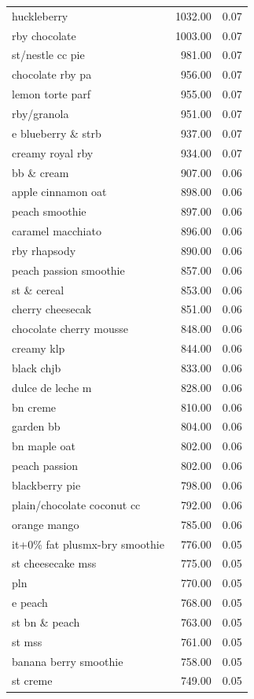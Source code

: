 \begin{table}
\begin{tabular}{lrr}
huckleberry & 1032.00 & 0.07 \\
rby chocolate & 1003.00 & 0.07 \\
st/nestle cc pie & 981.00 & 0.07 \\
chocolate rby pa & 956.00 & 0.07 \\
lemon torte parf & 955.00 & 0.07 \\
rby/granola & 951.00 & 0.07 \\
e blueberry \& strb & 937.00 & 0.07 \\
creamy royal rby & 934.00 & 0.07 \\
bb \& cream & 907.00 & 0.06 \\
apple cinnamon oat & 898.00 & 0.06 \\
peach smoothie & 897.00 & 0.06 \\
caramel macchiato & 896.00 & 0.06 \\
rby rhapsody & 890.00 & 0.06 \\
peach passion smoothie & 857.00 & 0.06 \\
st \& cereal & 853.00 & 0.06 \\
cherry cheesecak & 851.00 & 0.06 \\
chocolate cherry mousse & 848.00 & 0.06 \\
creamy klp & 844.00 & 0.06 \\
black chjb & 833.00 & 0.06 \\
dulce de leche m & 828.00 & 0.06 \\
bn creme & 810.00 & 0.06 \\
garden bb & 804.00 & 0.06 \\
bn maple oat & 802.00 & 0.06 \\
peach passion & 802.00 & 0.06 \\
blackberry pie & 798.00 & 0.06 \\
plain/chocolate coconut cc & 792.00 & 0.06 \\
orange mango & 785.00 & 0.06 \\
it+0\% fat plusmx-bry smoothie & 776.00 & 0.05 \\
st cheesecake mss & 775.00 & 0.05 \\
pln & 770.00 & 0.05 \\
e peach & 768.00 & 0.05 \\
st bn \& peach & 763.00 & 0.05 \\
st mss & 761.00 & 0.05 \\
banana berry smoothie & 758.00 & 0.05 \\
st creme & 749.00 & 0.05 \\

\end{tabular}
\end{table}
